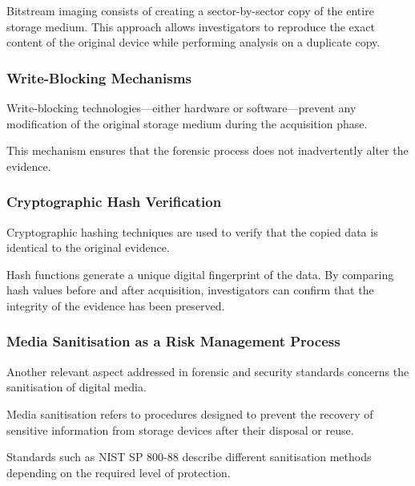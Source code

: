 \noindent
Bitstream imaging consists of creating a sector-by-sector copy of the entire storage medium.  
This approach allows investigators to reproduce the exact content of the original device while performing analysis on a duplicate copy.

\medskip

\subsubsection*{Write-Blocking Mechanisms}

\noindent
Write-blocking technologies—either hardware or software—prevent any modification of the original storage medium during the acquisition phase.

\medskip

\noindent
This mechanism ensures that the forensic process does not inadvertently alter the evidence.

\medskip

\subsubsection*{Cryptographic Hash Verification}

\noindent
Cryptographic hashing techniques are used to verify that the copied data is identical to the original evidence.

\medskip

\noindent
Hash functions generate a unique digital fingerprint of the data. By comparing hash values before and after acquisition, investigators can confirm that the integrity of the evidence has been preserved.

\medskip


\subsubsection{Media Sanitisation as a Risk Management Process}

\noindent
Another relevant aspect addressed in forensic and security standards concerns the sanitisation of digital media.

\medskip

\noindent
Media sanitisation refers to procedures designed to prevent the recovery of sensitive information from storage devices after their disposal or reuse.

\medskip

\noindent
Standards such as NIST SP 800-88 describe different sanitisation methods depending on the required level of protection.

